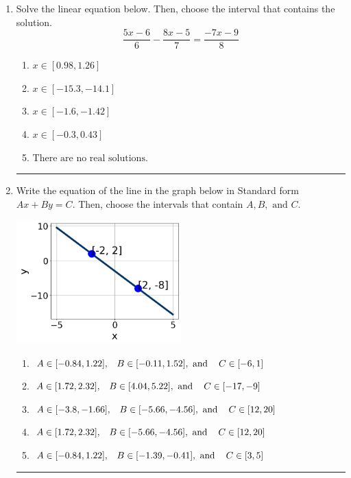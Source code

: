 \documentclass[14pt]{extbook}
\newcommand{\litem}[1]{\item#1\hspace*{-1cm}\rule{\textwidth}{0.4pt}}
\begin{document}
\begin{enumerate}
{\begin{enumerate}[label=\Alph*.]
\end{enumerate} }
\litem{
Solve the linear equation below. Then, choose the interval that contains the solution.\[ \frac{5x -6}{6} - \frac{8x -5}{7} = \frac{-7x -9}{8} \]\begin{enumerate}[label=\Alph*.]
\item \( x \in [0.98, 1.26] \)
\item \( x \in [-15.3, -14.1] \)
\item \( x \in [-1.6, -1.42] \)
\item \( x \in [-0.3, 0.43] \)
\item \( \text{There are no real solutions.} \)

\end{enumerate} }
\litem{
Write the equation of the line in the graph below in Standard form $Ax+By=C$. Then, choose the intervals that contain $A, B, \text{ and } C$.
\begin{center}
    \includegraphics[width=0.5\textwidth]{../Figures/linearGraphToStandardC.png}
\end{center}
\begin{enumerate}[label=\Alph*.]
\item \( A \in [-0.84, 1.22], \hspace{3mm} B \in [-0.11, 1.52], \text{ and } \hspace{3mm} C \in [-6, 1] \)
\item \( A \in [1.72, 2.32], \hspace{3mm} B \in [4.04, 5.22], \text{ and } \hspace{3mm} C \in [-17, -9] \)
\item \( A \in [-3.8, -1.66], \hspace{3mm} B \in [-5.66, -4.56], \text{ and } \hspace{3mm} C \in [12, 20] \)
\item \( A \in [1.72, 2.32], \hspace{3mm} B \in [-5.66, -4.56], \text{ and } \hspace{3mm} C \in [12, 20] \)
\item \( A \in [-0.84, 1.22], \hspace{3mm} B \in [-1.39, -0.41], \text{ and } \hspace{3mm} C \in [3, 5] \)


\end{enumerate}}
\end{enumerate}
\end{document}
